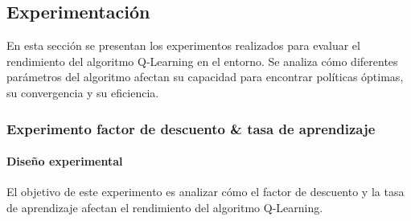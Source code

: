 \subsection{Experimentación}

En esta sección se presentan los experimentos realizados para evaluar el rendimiento del algoritmo Q-Learning en el entorno. Se analiza cómo diferentes parámetros del algoritmo afectan su capacidad para encontrar políticas óptimas, su convergencia y su eficiencia.

\subsubsection{Experimento factor de descuento \& tasa de aprendizaje}

\paragraph{Diseño experimental}

El objetivo de este experimento es analizar cómo el factor de descuento y la tasa de aprendizaje afectan el rendimiento del algoritmo Q-Learning.

